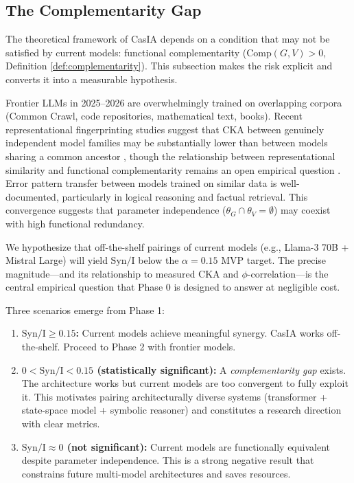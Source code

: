 \documentclass[11pt,a4paper]{article}
\theoremstyle{remark}
\newcommand{\Syn}{\mathrm{Syn}}
\newcommand{\MI}{\mathrm{I}}
\begin{document}
\subsection{The Complementarity Gap}
\label{sec:gap}

The theoretical framework of CasIA depends on a condition that may not be satisfied by current models: functional complementarity ($\mathrm{Comp}(G, V) > 0$, Definition \ref{def:complementarity}). This subsection makes the risk explicit and converts it into a measurable hypothesis.

Frontier LLMs in 2025--2026 are overwhelmingly trained on overlapping corpora (Common Crawl, code repositories, mathematical text, books). Recent representational fingerprinting studies suggest that CKA between genuinely independent model families may be substantially lower than between models sharing a common ancestor \cite{zhang2025reef}, though the relationship between representational similarity and functional complementarity remains an open empirical question \cite{davari2022cka}. Error pattern transfer between models trained on similar data is well-documented, particularly in logical reasoning and factual retrieval. This convergence suggests that parameter independence ($\theta_G \cap \theta_V = \emptyset$) may coexist with high functional redundancy.

We hypothesize that off-the-shelf pairings of current models (e.g., Llama-3 70B + Mistral Large) will yield $\Syn/\MI$ below the $\alpha = 0.15$ MVP target. The precise magnitude---and its relationship to measured CKA and $\phi$-correlation---is the central empirical question that Phase 0 is designed to answer at negligible cost.

Three scenarios emerge from Phase 1:
\begin{enumerate}
  \item \textbf{$\Syn/\MI \geq 0.15$:} Current models achieve meaningful synergy. CasIA works off-the-shelf. Proceed to Phase 2 with frontier models.
  \item \textbf{$0 < \Syn/\MI < 0.15$ (statistically significant):} A \emph{complementarity gap} exists. The architecture works but current models are too convergent to fully exploit it. This motivates pairing architecturally diverse systems (transformer + state-space model + symbolic reasoner) and constitutes a research direction with clear metrics.
  \item \textbf{$\Syn/\MI \approx 0$ (not significant):} Current models are functionally equivalent despite parameter independence. This is a strong negative result that constrains future multi-model architectures and saves resources.
\end{enumerate}
\end{document}
